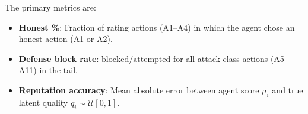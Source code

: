 The primary metrics are:
\begin{itemize}[noitemsep]
  \item \textbf{Honest \%}: Fraction of rating actions (A1--A4) in which the
        agent chose an honest action (A1 or A2).
  \item \textbf{Defense block rate}: $\text{blocked} / \text{attempted}$
        for all attack-class actions (A5--A11) in the tail.
  \item \textbf{Reputation accuracy}: Mean absolute error between agent score
        $\mu_i$ and true latent quality $q_i \sim \mathcal{U}[0,1]$.
\end{itemize}

